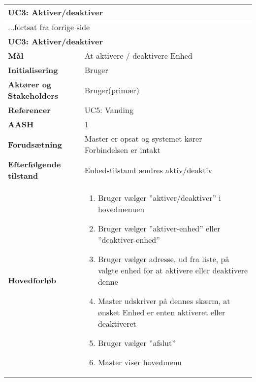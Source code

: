 \begin{center} \centering \label{UC3} 
	\begin{longtable}{|p{5cm}|p{9cm}|}  %
	\hline
		\multicolumn{2}{|l|}{\textbf{UC3: Aktiver/deaktiver}} \\\hline %
		\endfirsthead
		
		\multicolumn{2}{l}{...fortsat fra forrige side} \\ \hline %
		\multicolumn{2}{|l|}{\textbf{UC3: Aktiver/deaktiver}} \\\hline %
		\endhead	
		
		\textbf{Mål}								&At aktivere / deaktivere Enhed	\\\hline
		\textbf{Initialisering}					&Bruger				\\\hline
		\textbf{Aktører og Stakeholders}			&Bruger(primær)		\\\hline
		\textbf{Referencer}						&UC5: Vanding		\\\hline
		\textbf{AASH}							&1					\\\hline
		\textbf{Forudsætning}					&Master er opsat og systemet kører \newline
												 Forbindelsen er intakt	\\\hline
		\textbf{Efterfølgende tilstand}			&Enhedstilstand ændres aktiv/deaktiv\\\hline
		\textbf{Hovedforløb}					
			&\begin{enumerate}
	
				\item Bruger vælger ''aktiver/deaktiver'' i hovedmenuen
				
				\item Bruger vælger ''aktiver-enhed'' eller ''deaktiver-enhed''
				
				\item Bruger vælger adresse, ud fra liste, på valgte enhed for at aktivere eller deaktivere denne
				
				\item Master udskriver på dennes skærm, at ønsket Enhed er enten aktiveret eller deaktiveret	
				\item Bruger vælger ''afslut''
				
				\item Master viser hovedmenu
	
			\end{enumerate}\\\hline
	\end{longtable}
\end{center}

